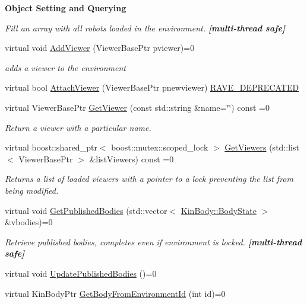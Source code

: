 \begin{Indent}{\bf Object Setting and Querying}
\begin{DoxyCompactItemize}
\begin{DoxyCompactList}\small\item\em Fill an array with all robots loaded in the environment. {\bfseries \mbox{[}multi-\/thread safe\mbox{]}} \item\end{DoxyCompactList}\item 
virtual void \hyperlink{classOpenRAVE_1_1EnvironmentBase_ab1f4975774bc81e490b22698302a61fa}{AddViewer} (ViewerBasePtr pviewer)=0
\begin{DoxyCompactList}\small\item\em adds a viewer to the environment \item\end{DoxyCompactList}\item 
virtual bool \hyperlink{classOpenRAVE_1_1EnvironmentBase_a90f75894de7b1b01e9a2e16021ac3f7d}{AttachViewer} (ViewerBasePtr pnewviewer) \hyperlink{classOpenRAVE_1_1EnvironmentBase_acb298cf75a95a9dcfdc2bfccd7321413}{RAVE\_\-DEPRECATED}
\item 
virtual ViewerBasePtr \hyperlink{classOpenRAVE_1_1EnvironmentBase_a422dc0ce03020fb713107d287510af83}{GetViewer} (const std::string \&name=\char`\"{}\char`\"{}) const =0
\begin{DoxyCompactList}\small\item\em Return a viewer with a particular name. \item\end{DoxyCompactList}\item 
virtual boost::shared\_\-ptr$<$ boost::mutex::scoped\_\-lock $>$ \hyperlink{classOpenRAVE_1_1EnvironmentBase_aaabc93c6dca5c4a1362b20bddb5d1e14}{GetViewers} (std::list$<$ ViewerBasePtr $>$ \&listViewers) const =0
\begin{DoxyCompactList}\small\item\em Returns a list of loaded viewers with a pointer to a lock preventing the list from being modified. \item\end{DoxyCompactList}\item 
virtual void \hyperlink{classOpenRAVE_1_1EnvironmentBase_a58c19f8ad04b2a8b6341677420ad9b6a}{GetPublishedBodies} (std::vector$<$ \hyperlink{classOpenRAVE_1_1KinBody_1_1BodyState}{KinBody::BodyState} $>$ \&vbodies)=0
\begin{DoxyCompactList}\small\item\em Retrieve published bodies, completes even if environment is locked. {\bfseries \mbox{[}multi-\/thread safe\mbox{]}} \item\end{DoxyCompactList}\item 
virtual void \hyperlink{classOpenRAVE_1_1EnvironmentBase_a590ea693633476a7aa2bc1c79bff8549}{UpdatePublishedBodies} ()=0
\item 
\hypertarget{classOpenRAVE_1_1EnvironmentBase_a9b293f0da231072d2e50a4a4e9299167}{
virtual KinBodyPtr \hyperlink{classOpenRAVE_1_1EnvironmentBase_a9b293f0da231072d2e50a4a4e9299167}{GetBodyFromEnvironmentId} (int id)=0}
\label{classOpenRAVE_1_1EnvironmentBase_a9b293f0da231072d2e50a4a4e9299167}


\end{DoxyCompactItemize}
\end{Indent}
